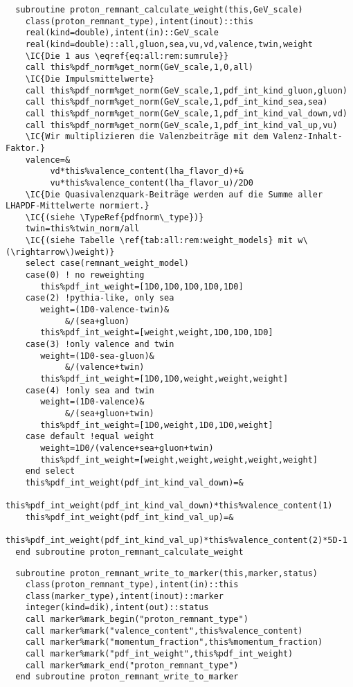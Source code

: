 \begin{Verbatim}
  subroutine proton_remnant_calculate_weight(this,GeV_scale)
    class(proton_remnant_type),intent(inout)::this
    real(kind=double),intent(in)::GeV_scale
    real(kind=double)::all,gluon,sea,vu,vd,valence,twin,weight
    \IC{Die 1 aus \eqref{eq:all:rem:sumrule}}
    call this%pdf_norm%get_norm(GeV_scale,1,0,all)
    \IC{Die Impulsmittelwerte}
    call this%pdf_norm%get_norm(GeV_scale,1,pdf_int_kind_gluon,gluon)
    call this%pdf_norm%get_norm(GeV_scale,1,pdf_int_kind_sea,sea)
    call this%pdf_norm%get_norm(GeV_scale,1,pdf_int_kind_val_down,vd)
    call this%pdf_norm%get_norm(GeV_scale,1,pdf_int_kind_val_up,vu)
    \IC{Wir multiplizieren die Valenzbeiträge mit dem Valenz-Inhalt-Faktor.}
    valence=&
         vd*this%valence_content(lha_flavor_d)+&
         vu*this%valence_content(lha_flavor_u)/2D0
    \IC{Die Quasivalenzquark-Beiträge werden auf die Summe aller LHAPDF-Mittelwerte normiert.}
    \IC{(siehe \TypeRef{pdfnorm\_type})}
    twin=this%twin_norm/all
    \IC{(siehe Tabelle \ref{tab:all:rem:weight_models} mit w\(\rightarrow\)weight)}
    select case(remnant_weight_model)
    case(0) ! no reweighting
       this%pdf_int_weight=[1D0,1D0,1D0,1D0,1D0]
    case(2) !pythia-like, only sea
       weight=(1D0-valence-twin)&
            &/(sea+gluon)
       this%pdf_int_weight=[weight,weight,1D0,1D0,1D0]
    case(3) !only valence and twin
       weight=(1D0-sea-gluon)&
            &/(valence+twin)
       this%pdf_int_weight=[1D0,1D0,weight,weight,weight]
    case(4) !only sea and twin
       weight=(1D0-valence)&
            &/(sea+gluon+twin)
       this%pdf_int_weight=[1D0,weight,1D0,1D0,weight]
    case default !equal weight
       weight=1D0/(valence+sea+gluon+twin)
       this%pdf_int_weight=[weight,weight,weight,weight,weight]
    end select
    this%pdf_int_weight(pdf_int_kind_val_down)=&
      this%pdf_int_weight(pdf_int_kind_val_down)*this%valence_content(1)
    this%pdf_int_weight(pdf_int_kind_val_up)=&
      this%pdf_int_weight(pdf_int_kind_val_up)*this%valence_content(2)*5D-1
  end subroutine proton_remnant_calculate_weight
\end{Verbatim}

\begin{Verbatim}
  subroutine proton_remnant_write_to_marker(this,marker,status)
    class(proton_remnant_type),intent(in)::this
    class(marker_type),intent(inout)::marker
    integer(kind=dik),intent(out)::status
    call marker%mark_begin("proton_remnant_type")
    call marker%mark("valence_content",this%valence_content)
    call marker%mark("momentum_fraction",this%momentum_fraction)
    call marker%mark("pdf_int_weight",this%pdf_int_weight)
    call marker%mark_end("proton_remnant_type")
  end subroutine proton_remnant_write_to_marker
\end{Verbatim}

